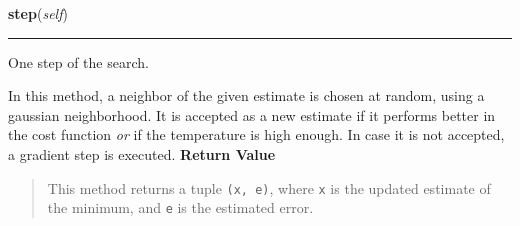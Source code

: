     \label{peach:sa:base:ContinuousSA:step}

    \vspace{0.5ex}

\hspace{.8\funcindent}\begin{boxedminipage}{\funcwidth}

    \raggedright \textbf{step}(\textit{self})

    \vspace{-1.5ex}

    \rule{\textwidth}{0.5\fboxrule}
\setlength{\parskip}{2ex}

One step of the search.

In this method, a neighbor of the given estimate is chosen at random,
using a gaussian neighborhood. It is accepted as a new estimate if it
performs better in the cost function \emph{or} if the temperature is high
enough. In case it is not accepted, a gradient step is executed.
\setlength{\parskip}{1ex}
      \textbf{Return Value}
    \vspace{-1ex}

      \begin{quote}

This method returns a tuple \texttt{(x, e)}, where \texttt{x} is the updated
estimate of the minimum, and \texttt{e} is the estimated error.
      \end{quote}

    \end{boxedminipage}

    \label{peach:sa:base:ContinuousSA:__call__}

    \vspace{0.5ex}

